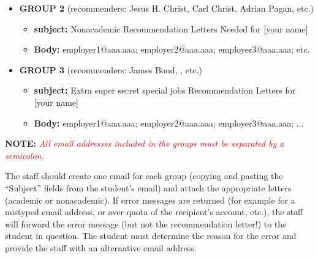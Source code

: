 \documentclass{econtex}
\begin{document}
\begin{enumerate}
\begin{itemize}
\item {\bf  GROUP 2} (recommenders: Jesus H. Christ, Carl Christ, Adrian Pagan, etc.)
\begin{itemize}
\item {\bf  subject:} Nonacademic Recommendation Letters Needed for [your name]
\item {\bf  Body:} employer1@aaa.aaa; employer2@aaa.aaa; employer3@aaa.aaa; etc.
\end{itemize}

\item {\bf  GROUP 3} (recommenders: James Bond, , etc.)
\begin{itemize}
\item {\bf  subject:} Extra super secret special jobs Recommendation Letters for [your name]
\item {\bf  Body:} employer1@aaa.aaa; employer2@aaa.aaa; employer3@aaa.aaa; ...
\end{itemize}
\end{itemize}

\textbf{NOTE:} \textcolor{red}{\textit{All email addresses included in the groups must be separated by a semicolon.}}

\normalsize

The staff should create one email for each group (copying and pasting
the ``Subject'' fields from the student's email) and attach
the appropriate letters (academic or nonacademic).  If error
messages are returned (for example for a mistyped email address, or
over quota of the recipient's account, etc.), the staff will forward
the error message (but not the recommendation letter!) to the student
in question. The student must determine the reason for the error and
provide the staff with an alternative email address.



\end{enumerate}
\end{document}
